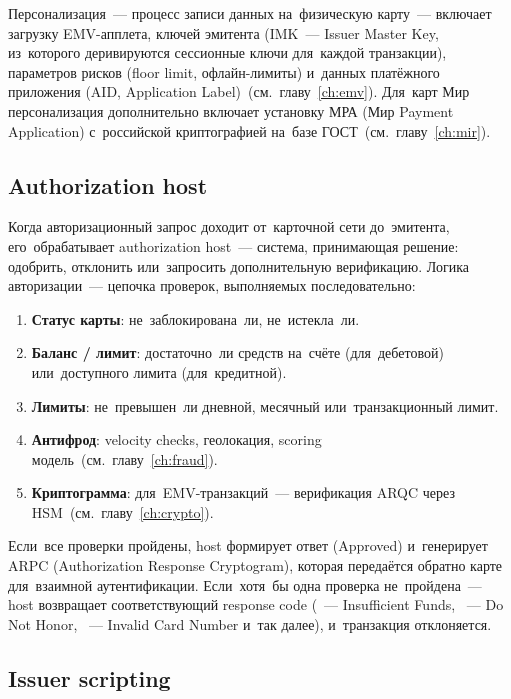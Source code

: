 Персонализация~--- процесс записи данных на~физическую карту~---
включает загрузку EMV-апплета, ключей эмитента (IMK~---
Issuer Master Key, из~которого деривируются сессионные ключи
для~каждой транзакции), параметров рисков (floor limit,
офлайн-лимиты) и~данных платёжного приложения (AID, Application
Label)~(см.~главу~\ref{ch:emv}). Для~карт Мир персонализация
дополнительно включает установку МРА (Мир Payment Application)
с~российской криптографией на~базе
ГОСТ~(см.~главу~\ref{ch:mir}).

\subsection*{Authorization host}

Когда авторизационный запрос доходит от~карточной сети
до~эмитента, его~обрабатывает authorization host~--- система,
принимающая решение: одобрить, отклонить или~запросить
дополнительную верификацию. Логика авторизации~--- цепочка
проверок, выполняемых последовательно:

\begin{enumerate}
  \item \textbf{Статус карты}: не~заблокирована~ли, не~истекла~ли.
  \item \textbf{Баланс / лимит}: достаточно~ли средств на~счёте
        (для~дебетовой) или~доступного лимита (для~кредитной).
  \item \textbf{Лимиты}: не~превышен~ли дневной, месячный
        или~транзакционный лимит.
  \item \textbf{Антифрод}: velocity checks, геолокация, scoring
        модель~(см.~главу~\ref{ch:fraud}).
  \item \textbf{Криптограмма}: для~EMV-транзакций~---
        верификация ARQC через
        HSM~(см.~главу~\ref{ch:crypto}).
\end{enumerate}

Если~все проверки пройдены, host формирует ответ 
(Approved) и~генерирует ARPC (Authorization Response
Cryptogram), которая передаётся обратно карте для~взаимной
аутентификации. Если~хотя~бы одна проверка не~пройдена~---
host возвращает соответствующий response code (~---
Insufficient Funds, ~--- Do Not Honor, ~---
Invalid Card Number и~так далее), и~транзакция отклоняется.

\subsection*{Issuer scripting}

